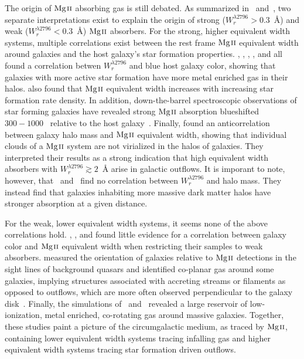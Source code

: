 \documentclass[iop,apj,numberedappendix,appendixfloats,twocolappendix]{emulateapj}
\begin{document}
The origin of ${\hbox{{\rm Mg}\kern 0.1em{\sc ii}}}$ absorbing gas is still debated. As summarized in~\cite{Kacprzak2011} and~\cite{Matejek2013}, two separate interpretations exist to explain the origin of strong ($W_r^{\lambda2796} > 0.3$~{\AA}) and weak ($W_r^{\lambda2796} < 0.3$~{\AA}) ${\hbox{{\rm Mg}\kern 0.1em{\sc ii}}}$ absorbers. For the strong, higher equivalent width systems, multiple correlations exist between the rest frame ${\hbox{{\rm Mg}\kern 0.1em{\sc ii}}}$ equivalent width around galaxies and the host galaxy's star formation properties. \cite{Zibetti2007}, \cite{Lundgren2009}, \cite{Noterdaeme2010}, \cite{Bordoloi2011}, and \cite{Nestor2011} all found a correlation betwen $W_r^{\lambda2796}$ and blue host galaxy color, showing that galaxies with more active star formation have more metal enriched gas in their halos. \cite{Bordoloi2014} also found that ${\hbox{{\rm Mg}\kern 0.1em{\sc ii}}}$ equivalent width increases with increasing star formation rate density. In addition, down-the-barrel spectroscopic observations of star forming galaxies have revealed strong ${\hbox{{\rm Mg}\kern 0.1em{\sc ii}}}$ absorption blueshifted $300 - 1000$~{\kms} relative to the host galaxy~\citep{Tremonti2007,Weiner2009,Martin2009,Rubin2010}. Finally, \cite{Bouche2006} found an anticorrelation between galaxy halo mass and ${\hbox{{\rm Mg}\kern 0.1em{\sc ii}}}$ equivalent width, showing that individual clouds of a ${\hbox{{\rm Mg}\kern 0.1em{\sc ii}}}$ system are not virialized in the halos of galaxies. They interpreted their results as a strong indication that high equivalent width absorbers with $W_r^{\lambda2796} \gtrsim 2$~{\AA} arise in galactic outflows. It is imporant to note, however, that~\cite{Churchill2013letter} and~\cite{MAGIICAT3} find no correlation between $W_r^{\lambda2796}$ and halo mass. They instead find that galaxies inhabiting more massive dark matter halos have stronger absorption at a given distance.

For the weak, lower equivalent width systems, it seems none of the above correlations hold. \cite{Chen2010b}, \cite{Kacprzak2011}, and \cite{Lovegrove2011} found little evidence for a correlation between galaxy color and ${\hbox{{\rm Mg}\kern 0.1em{\sc ii}}}$ equivalent width when restricting their samples to weak absorbers. \cite{Kacprzak2011} measured the orientation of galaxies relative to ${\hbox{{\rm Mg}\kern 0.1em{\sc ii}}}$ detections in the sight lines of background quasars and identified co-planar gas around some galaxies, implying structures associated with accreting streams or filaments as opposed to outflows, which are more often observed perpendicular to the galaxy disk~\citep{Bordoloi2011,Kacprzak2012-PA}. Finally, the simulations of~\cite{Stewart2011} and~\cite{Ford2013mass} revealed a large reservoir of low-ionization, metal enriched, co-rotating gas around massive galaxies. Together, these studies paint a picture of the circumgalactic medium, as traced by ${\hbox{{\rm Mg}\kern 0.1em{\sc ii}}}$, containing lower equivalent width systems tracing infalling gas and higher equivalent width systems tracing star formation driven outflows.
\end{document}
